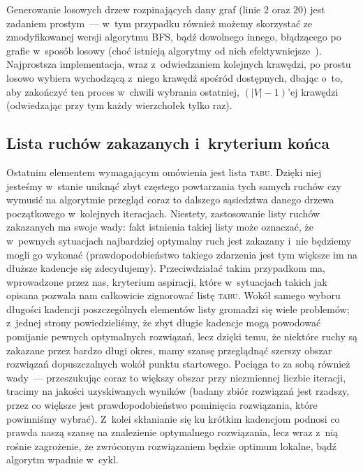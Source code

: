 Generowanie losowych drzew rozpinających dany graf (linie $2$ oraz $20$) jest zadaniem prostym~--- w~tym przypadku również możemy skorzystać ze zmodyfikowanej wersji algorytmu \textsc{BFS}, bądź dowolnego innego, błądzącego po grafie w~sposób losowy (choć istnieją algorytmy od nich efektywniejsze~\cite{Wilson:1996:GRS:237814.237880}).
Najprostsza implementacja, wraz z~odwiedzaniem kolejnych krawędzi, po prostu losowo wybiera wychodzącą z~niego krawędź spośród dostępnych, dbając o~to, aby zakończyć ten proces w~chwili wybrania ostatniej, $\left( \left| V \right| - 1 \right)$'ej krawędzi (odwiedzając przy tym każdy wierzchołek tylko raz).



\subsection{Lista ruchów zakazanych i~kryterium końca}



Ostatnim elementem wymagającym omówienia jest lista \textsc{tabu}.
Dzięki niej jesteśmy w~stanie uniknąć zbyt częstego powtarzania tych samych ruchów czy wymusić na algorytmie przegląd coraz to dalszego sąsiedztwa danego drzewa początkowego w~kolejnych iteracjach.
Niestety, zastosowanie listy ruchów zakazanych ma swoje wady: fakt istnienia takiej listy może oznaczać, że w~pewnych sytuacjach najbardziej optymalny ruch jest zakazany i~nie będziemy mogli go wykonać (prawdopodobieństwo takiego zdarzenia jest tym większe im na dłuższe kadencje się zdecydujemy).
Przeciwdziałać takim przypadkom ma, wprowadzone przez nas, kryterium aspiracji, które w~sytuacjach takich jak opisana pozwala nam całkowicie zignorować listę \textsc{tabu}.
Wokół samego wyboru długości kadencji poszczególnych elementów listy gromadzi się wiele problemów; z~jednej strony powiedzieliśmy, że zbyt długie kadencje mogą powodować pomijanie pewnych optymalnych rozwiązań, lecz dzięki temu, że niektóre ruchy są zakazane przez bardzo długi okres, mamy szansę przeglądnąć szerszy obszar rozwiązań dopuszczalnych wokół punktu startowego.
Pociąga to za sobą również wady~--- przeszukując coraz to większy obszar przy niezmiennej liczbie iteracji, tracimy na jakości uzyskiwanych wyników (badany zbiór rozwiązań jest rzadszy, przez co większe jest prawdopodobieństwo pominięcia rozwiązania, które powinniśmy wybrać).
Z~kolei skłanianie się ku krótkim kadencjom podnosi co prawda naszą szansę na znalezienie optymalnego rozwiązania, lecz wraz z~nią rośnie zagrożenie, że zwróconym rozwiązaniem będzie optimum lokalne, bądź algorytm wpadnie w~cykl.

